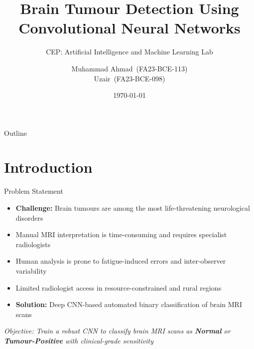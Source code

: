 \documentclass[aspectratio=169,11pt]{beamer}
\title{Brain Tumour Detection Using\\Convolutional Neural Networks}
\subtitle{CEP: Artificial Intelligence and Machine Learning Lab}
\author{%
  Muhammad Ahmad~{\small(FA23-BCE-113)}\\[2pt]
  Uzair~{\small(FA23-BCE-098)}%
}
\date{\today}
\institute{Computer Engineering Department\\COMSATS University Islamabad -- Lahore Campus}
\begin{document}

\begin{frame}
    \titlepage
\end{frame}

\begin{frame}{Outline}
    \tableofcontents
\end{frame}

\section{Introduction}

\begin{frame}{Problem Statement}
    \begin{itemize}\setlength\itemsep{5pt}
        \item \textbf{Challenge:} Brain tumours are among the most life-threatening neurological disorders
        \item Manual MRI interpretation is time-consuming and requires specialist radiologists
        \item Human analysis is prone to fatigue-induced errors and inter-observer variability
        \item Limited radiologist access in resource-constrained and rural regions
        \item \textbf{Solution:} Deep CNN-based automated binary classification of brain MRI scans
    \end{itemize}
    \vspace{0.35cm}
    \begin{center}
        \small\textit{Objective: Train a robust CNN to classify brain MRI scans as%
        \textbf{ Normal} or \textbf{Tumour-Positive} with clinical-grade sensitivity}
    \end{center}
\end{frame}
\end{document}
